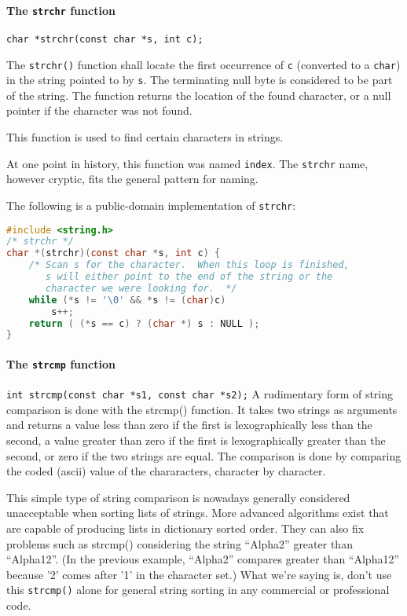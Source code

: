 \paragraph{The \texttt{strchr} function}
\texttt{char *strchr(const char *s, int c);}

The \texttt{strchr()} function shall locate the first occurrence of \texttt{c}
(converted to a \texttt{char}) in the string pointed to by \texttt{s}. The
terminating null byte is considered to be part of the string. The function
returns the location of the found character, or a null pointer if the character
was not found.

This function is used to find certain characters in strings.

At one point in history, this function was named \texttt{index}. The
\texttt{strchr} name, however cryptic, fits the general pattern for naming.

The following is a public-domain implementation of \texttt{strchr}:
\lstset{basicstyle=\scriptsize, numbers=left, captionpos=b, tabsize=4}
\begin{lstlisting}[caption=Section \thesection listing \arabic{stringcnt},language={C},
breaklines=true,xleftmargin=15pt,label=lst:section\thesection listing\arabic{stringcnt}]
#include <string.h>
/* strchr */
char *(strchr)(const char *s, int c) {
	/* Scan s for the character.  When this loop is finished,
	   s will either point to the end of the string or the
	   character we were looking for.  */
	while (*s != '\0' && *s != (char)c)
		s++;
	return ( (*s == c) ? (char *) s : NULL );
}
\end{lstlisting}

\paragraph{The \texttt{strcmp} function}
\texttt{int strcmp(const char *s1, const char *s2);}
A rudimentary form of string comparison is done with the strcmp() function. It
takes two strings as arguments and returns a value less than zero if the first
is lexographically less than the second, a value greater than zero if the first
is lexographically greater than the second, or zero if the two strings are
equal. The comparison is done by comparing the coded (ascii) value of the
chararacters, character by character.

This simple type of string comparison is nowadays generally considered
unacceptable when sorting lists of strings.  More advanced algorithms exist
that are capable of producing lists in dictionary sorted order. They can also
fix problems such as strcmp() considering the string ``Alpha2'' greater than
``Alpha12''. (In the previous example, ``Alpha2'' compares greater than
``Alpha12'' because '2' comes after '1' in the character set.) What we're
saying is, don't use this \texttt{strcmp()} alone for general string sorting in
any commercial or professional code.

